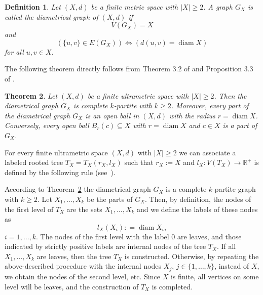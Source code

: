 \documentclass[pdflatex,sn-mathphys-num]{sn-jnl}%
\theoremstyle{thmstyleone}%
\newtheorem{Theorem}{Theorem}[section]
\theoremstyle{thmstyletwo}%
\theoremstyle{thmstylethree}%
\newtheorem{Definition}[Theorem]{Definition}
\theoremstyle{thmstyletwo}%
\theoremstyle{thmstylethree}%
\begin{document}
\begin{Definition}\label{dvhj} Let $(X,d)$ be a finite metric space with $|X| \geq 2$. A graph  $G_{X}$ is called the {\it diametrical graph} of $(X,d)$ if  
\[
V(G_{X}) = X
\]
 and 
\begin{equation}
    \label{ojhr}
(\{u,v\} \in E(G_{X})) \iff (d(u,v) = \operatorname{diam} X)
\end{equation}
for all $u, v \in X$.
\end{Definition}



The following theorem  directly follows from Theorem 3.2 of \cite{DDP2011pNUAA} and Proposition 3.3 of \cite{BDK2022TAG}.

\begin{Theorem}\label{ref} Let $(X,d)$ be a finite ultrametric space with $|X| \geq 2$. Then  the  diametrical graph $G_{X}$ is complete $k$-partite with $k\geq 2$. Moreover, every part of the diametrical graph $G_{X}$ is an open ball in $(X,d)$ with the radius $r=\operatorname{diam} X$. Conversely, every open ball $B_r(c)\subseteq X$ with $r=\operatorname{diam} X$ and $c\in X$ is a part of $G_{X}$.
\end{Theorem}






For every finite ultrametric space $(X,d)$ with $|X|\geq 2$ we can associate a labeled rooted tree
$T_X = T_X(r_X,l_X)$ such that $r_X:= X$ and $l_X : V(T_X) \to \mathbb{R}^{+}$ is defined by the following rule (see~\cite{PD2014JMS}).


According to Theorem~\ref{ref} the diametrical graph $G_X$ is a complete $k$-partite graph with $k\geq 2$. Let $X_1,\ldots,X_k$ be the parts of $G_X$.
Then, by definition, the nodes of the first level of $T_X$ are the sets
$X_1, \ldots, X_k$ and we define the labels of these nodes as
\begin{equation}\label{gfuika}
l_X(X_i): = \operatorname{diam} X_i,
\end{equation}
$i = 1,\ldots,k$. 
The nodes of the first level with the label $0$ are leaves, and those indicated by strictly
positive labels are internal nodes of the tree $T_X$. If all $X_1, \ldots, X_k$ are leaves,
then the tree $T_X$ is constructed. Otherwise, by repeating the above-described procedure
with the internal nodes $X_j$, $j\in \{1,\ldots,k\}$, instead of $X$, we obtain the nodes of the second level, etc.
Since $X$ is finite, all vertices on some level will be leaves, and the construction of
$T_X$ is completed.
\end{document}
